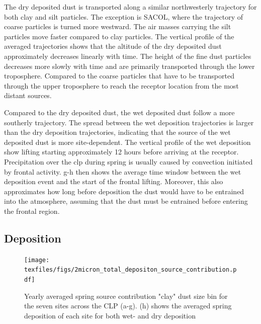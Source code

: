 The dry deposited dust is transported along a similar northwesterly trajectory for both clay and silt particles. 
The exception is SACOL, where the trajectory of coarse particles is turned more westward. 
The air masses carrying the silt particles move faster compared to clay particles.  
The vertical profile of the averaged trajectories shows that the altitude of the dry deposited dust approximately decreases linearly with time. 
The height of the fine dust particles decreases more slowly with time and  are primarily transported through the lower troposphere.
Compared to the coarse particles that have to be transported through the upper troposphere to reach the receptor location from the most distant sources. 
 
Compared to the dry deposited dust, the wet deposited dust follow a more southerly trajectory.
The spread between the wet deposition trajectories is larger than the dry deposition trajectories, indicating that the source of the wet deposited dust is more site-dependent.
The vertical profile of the wet deposition show lifting starting approximately 12 hours before arriving at the receptor. 
Precipitation over the \acrshort{clp} during spring is usually caused by convection initiated by frontal activity. g-h then shows the average time window between the wet deposition event and the start of the frontal lifting. Moreover, this also approximates how long before deposition the dust would have to be entrained into the atmosphere, assuming that the dust must be entrained before entering the frontal region.  
\subsection{Deposition}
\begin{figure}[htbp]
    \centering
    \texttt{[image: texfiles/figs/2micron\_total\_depositon\_source\_contribution.pdf]}
    \caption{Yearly averaged spring source contribution "clay" dust size bin for the seven sites across the CLP (a-g). (h) shows the averaged spring deposition of each site for both wet- and dry deposition}
    \label{fig:source_contrib_2mmu}
\end{figure}

